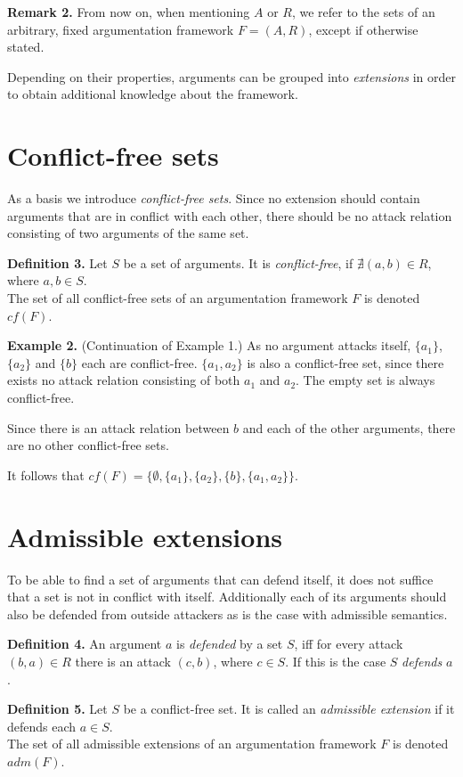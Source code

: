 \documentclass[draft,final]{vutinfth} %
\newcommand{\hl}{\par\vspace{6pt}} %
\newcommand{\cl}{\par\vspace{12pt}} %
\begin{document}
\textbf{Remark 2.} From now on, when mentioning $A$ or $R$, we refer to the sets of an arbitrary, fixed argumentation framework $F=(A,R)$, except if otherwise stated.\cl

Depending on their properties, arguments can be grouped into \emph{extensions} in order to obtain additional knowledge about the framework.\cl

\section{Conflict-free sets}

As a basis we introduce \emph{conflict-free sets}. Since no extension should contain arguments that are in conflict with each other, there should be no attack relation consisting of two arguments of the same set.\cl

\textbf{Definition 3.} Let $S$ be a set of arguments. It is \emph{conflict-free}, if $\nexists (a,b)\in R$, where $a,b\in S$.\\
The set of all conflict-free sets of an argumentation framework $F$ is denoted $cf(F)$.\cl

\textbf{Example 2.} (Continuation of Example 1.) As no argument attacks itself, $\{a_1\}$, $\{a_2\}$ and $\{b\}$ each are conflict-free. $\{a_1,a_2\}$ is also a conflict-free set, since there exists no attack relation consisting of both $a_1$ and $a_2$. The empty set is always conflict-free.\hl
Since there is an attack relation between $b$ and each of the other arguments, there are no other conflict-free sets.\hl
It follows that $cf(F)=\{\emptyset,\{a_1\},\{a_2\},\{b\},\{a_1,a_2\}\}$.\cl

\section{Admissible extensions}

To be able to find a set of arguments that can defend itself, it does not suffice that a set is not in conflict with itself. Additionally each of its arguments should also be defended from outside attackers as is the case with admissible semantics.\hl

\textbf{Definition 4.} An argument $a$ is \emph{defended} by a set $S$, iff for every attack $(b,a)\in R$ there is an attack $(c,b)$, where $c\in S$. If this is the case $S$ \emph{defends} $a$.\cl

\textbf{Definition 5.} Let $S$ be a conflict-free set. It is called an \emph{admissible extension} if it defends each $a\in S$.\\
The set of all admissible extensions of an argumentation framework $F$ is denoted $adm(F)$.\cl
\end{document}
